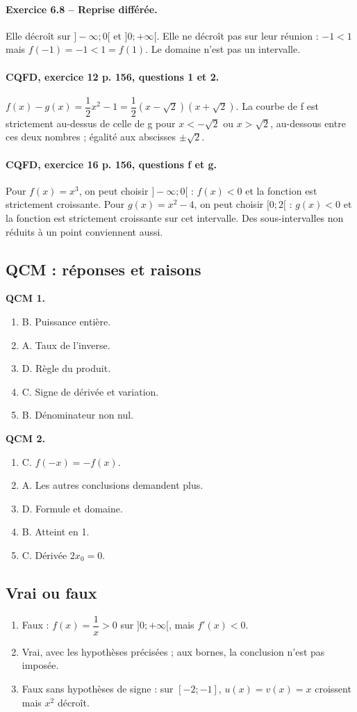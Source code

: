 \paragraph{Exercice 6.8 -- Reprise différée.} Elle décroît sur $]-\infty;0[$ et $]0;+\infty[$. Elle ne décroît pas sur leur réunion : $-1<1$ mais $f(-1)=-1<1=f(1)$. Le domaine n’est pas un intervalle.
\paragraph{CQFD, exercice 12 p. 156, questions 1 et 2.} $f(x)-g(x)=\dfrac12x^2-1=\dfrac12(x-\sqrt2)(x+\sqrt2)$. La courbe de f est strictement au-dessus de celle de g pour $x<-\sqrt2$ ou $x>\sqrt2$, au-dessous entre ces deux nombres ; égalité aux abscisses $\pm\sqrt2$.
\paragraph{CQFD, exercice 16 p. 156, questions f et g.} Pour $f(x)=x^3$, on peut choisir $]-\infty;0[$ : $f(x)<0$ et la fonction est strictement croissante. Pour $g(x)=x^2-4$, on peut choisir $[0;2[$ : $g(x)<0$ et la fonction est strictement croissante sur cet intervalle. Des sous-intervalles non réduits à un point conviennent aussi.
\subsection*{QCM : réponses et raisons}
\textbf{QCM 1.}
\begin{enumerate}
\item B. Puissance entière.
\item A. Taux de l’inverse.
\item D. Règle du produit.
\item C. Signe de dérivée et variation.
\item B. Dénominateur non nul.
\end{enumerate}
\textbf{QCM 2.}
\begin{enumerate}
\item C. $f(-x)=-f(x)$.
\item A. Les autres conclusions demandent plus.
\item D. Formule et domaine.
\item B. Atteint en 1.
\item C. Dérivée $2x_0=0$.
\end{enumerate}
\subsection*{Vrai ou faux}
\begin{enumerate}
\item Faux : $f(x)=\dfrac{1}{x}>0$ sur $]0;+\infty[$, mais $f\prime(x)<0$.
\item Vrai, avec les hypothèses précisées ; aux bornes, la conclusion n’est pas imposée.
\item Faux sans hypothèses de signe : sur $[-2;-1]$, $u(x)=v(x)=x$ croissent mais $x^2$ décroît.
\end{enumerate}
